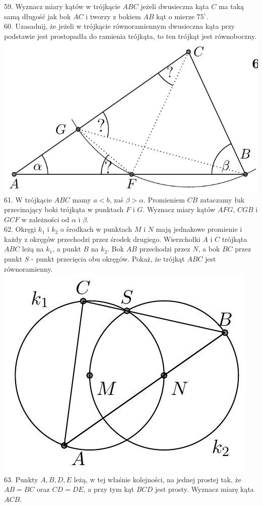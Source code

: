 \documentclass[10pt]{article}
\begin{document}
59. Wyznacz miary kątów w trójkącie \(A B C\) jeżeli dwusieczna kąta \(C\) ma taką samą długość jak bok \(A C\) i tworzy z bokiem \(A B\) kąt o mierze \(75^{\circ}\).\\
60. Uzasadnij, że jeżeli w trójkącie równoramiennym dwusieczna kąta przy podstawie jest prostopadła do ramienia trójkąta, to ten trójkąt jest równoboczny.\\
\includegraphics[max width=\textwidth, center]{2024_11_21_71f62bd117d375398909g-178(1)}\\
61. W trójkącie \(A B C\) mamy \(a<b\), zaś \(\beta>\alpha\). Promieniem \(C B\) zataczamy łuk przecinający boki trójkąta w punktach \(F\) i \(G\). Wyznacz miary kątów \(A F G\), \(C G B\) i \(G C F\) w zależności od \(\alpha\) i \(\beta\).\\
62. Okręgi \(k_{1}\) i \(k_{2}\) o środkach w punktach \(M\) i \(N\) mają jednakowe promienie i każdy z okręgów przechodzi przez środek drugiego. Wierzchołki \(A\) i \(C\) trójkąta \(A B C\) leżą na \(k_{1}\), a punkt \(B\) na \(k_{2}\). Bok \(A B\) przechodzi przez \(N\), a bok \(B C\) przez punkt \(S\) - punkt przecięcia obu okręgów. Pokaż, że trójkąt \(A B C\) jest równoramienny.\\
\includegraphics[max width=\textwidth, center]{2024_11_21_71f62bd117d375398909g-178}\\
63. Punkty \(A, B, D, E\) leżą, w tej właśnie kolejności, na jednej prostej tak, że \(A B=B C\) oraz \(C D=D E\), a przy tym kąt \(B C D\) jest prosty. Wyznacz miarę kąta \(A C B\).
\end{document}

